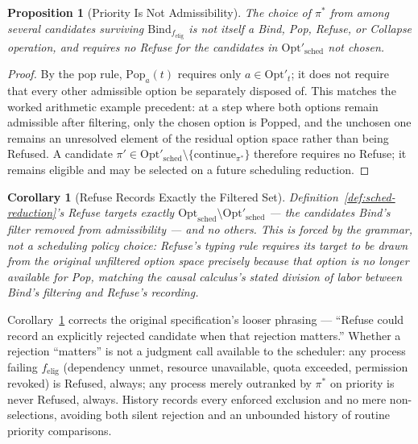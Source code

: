 \documentclass[11pt]{article}
\newtheorem{proposition}{Proposition}[section]
\newtheorem{corollary}{Corollary}[section]
\begin{document}
\begin{proposition}[Priority Is Not Admissibility]
\label{prop:priority-not-admissibility}
The choice of $\pi^*$ from among several candidates surviving $\mathrm{Bind}_{f_{\mathrm{elig}}}$ is not itself a Bind, Pop, Refuse, or Collapse operation, and requires no Refuse for the candidates in $\mathrm{Opt}'_{\mathrm{sched}}$ not chosen.
\end{proposition}
\begin{proof}
By the pop rule, $\mathrm{Pop}_a(t)$ requires only $a \in \mathrm{Opt}'_t$; it does not require that every other admissible option be separately disposed of. This matches the worked arithmetic example precedent: at a step where both options remain admissible after filtering, only the chosen option is Popped, and the unchosen one remains an unresolved element of the residual option space rather than being Refused. A candidate $\pi' \in \mathrm{Opt}'_{\mathrm{sched}} \setminus \{\mathrm{continue}_{\pi^*}\}$ therefore requires no Refuse; it remains eligible and may be selected on a future scheduling reduction.
\end{proof}

\begin{corollary}[Refuse Records Exactly the Filtered Set]
\label{cor:refuse-exact}
Definition~\ref{def:sched-reduction}'s Refuse targets exactly $\mathrm{Opt}_{\mathrm{sched}} \setminus \mathrm{Opt}'_{\mathrm{sched}}$ --- the candidates Bind's filter removed from admissibility --- and no others. This is forced by the grammar, not a scheduling policy choice: Refuse's typing rule requires its target to be drawn from the original unfiltered option space precisely because that option is no longer available for Pop, matching the causal calculus's stated division of labor between Bind's filtering and Refuse's recording.
\end{corollary}

Corollary~\ref{cor:refuse-exact} corrects the original specification's looser phrasing --- ``Refuse could record an explicitly rejected candidate when that rejection matters.'' Whether a rejection ``matters'' is not a judgment call available to the scheduler: any process failing $f_{\mathrm{elig}}$ (dependency unmet, resource unavailable, quota exceeded, permission revoked) is Refused, always; any process merely outranked by $\pi^*$ on priority is never Refused, always. History records every enforced exclusion and no mere non-selections, avoiding both silent rejection and an unbounded history of routine priority comparisons.
\end{document}
